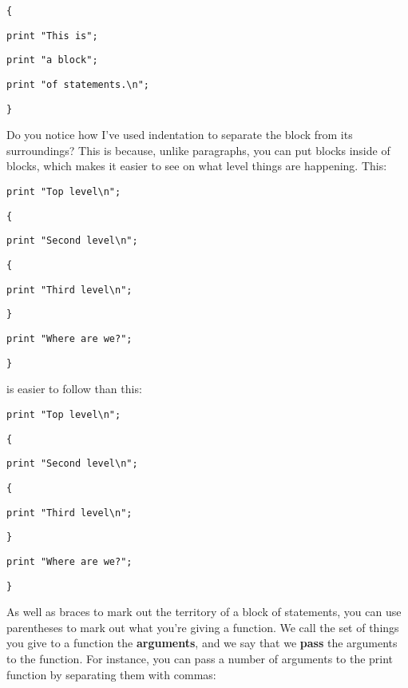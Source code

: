 \documentclass[a4paper,11pt]{book}
\begin{document}
\noindent 

\noindent \texttt{\{}

\noindent \texttt{print "This is";}

\noindent \texttt{print "a block";}

\noindent \texttt{print "of statements.\textbackslash n";}

\noindent \texttt{\}}

\noindent 

\noindent Do you notice how I've used indentation to separate the block from its surroundings? This is because, unlike paragraphs, you can put blocks inside of blocks, which makes it easier to see on what level things are happening. This:

\noindent 

\noindent \texttt{print "Top level\textbackslash n";}

\noindent \texttt{\{}

\noindent \texttt{print "Second level\textbackslash n";}

\noindent \texttt{\{}

\noindent \texttt{print "Third level\textbackslash n";}

\noindent \texttt{\}}

\noindent \texttt{print "Where are we?";}

\noindent \texttt{\}}

\noindent 

\noindent is easier to follow than this:

\noindent 

\noindent \texttt{print "Top level\textbackslash n";}

\noindent \texttt{\{}

\noindent \texttt{print "Second level\textbackslash n";}

\noindent \texttt{\{}

\noindent \texttt{print "Third level\textbackslash n";}

\noindent \texttt{\}}

\noindent \texttt{print "Where are we?";}

\noindent \texttt{\}}

\noindent 

\noindent As well as braces to mark out the territory of a block of statements, you can use parentheses to mark out what you're giving a function. We call the set of things you give to a function the \textbf{arguments}, and we say that we \textbf{pass }the arguments to the function. For instance, you can pass a number of arguments to the print function by separating them with commas:
\end{document}
